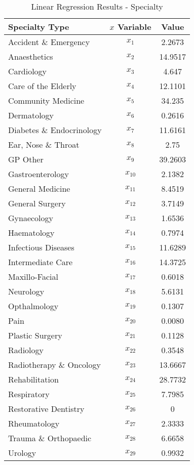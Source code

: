 \documentclass[../thesis.tex]{subfiles}
\begin{document}
\begin{table}[]
    \centering
    \begin{tabular}{lcc} \toprule
      Specialty Type   & $x$ Variable & Value \\ \midrule
      Accident \& Emergency & $x_{1}$ & 2.2673\\ 
      Anaesthetics & $x_{2}$ & 14.9517 \\
      Cardiology & $x_{3}$ & 4.647\\
      Care of the Elderly & $x_{4}$ & 12.1101 \\
      Community Medicine & $x_{5}$ & 34.235\\
      Dermatology & $x_{6}$ & 0.2616\\
      Diabetes \& Endocrinology & $x_{7}$ & 11.6161\\
      Ear, Nose \& Throat & $x_{8}$ &2.75 \\
      GP Other & $x_{9}$ & 39.2603\\
      Gastroenterology & $x_{10}$ &2.1382 \\
      General Medicine & $x_{11}$ & 8.4519\\
      General Surgery & $x_{12}$ & 3.7149\\
      Gynaecology & $x_{13}$ & 1.6536\\
      Haematology & $x_{14}$ & 0.7974\\
      Infectious Diseases & $x_{15}$ &11.6289 \\
      Intermediate Care & $x_{16}$ &14.3725 \\
      Maxillo-Facial & $x_{17}$ & 0.6018\\
      Neurology & $x_{18}$ & 5.6131 \\
      Opthalmology & $x_{19}$ &0.1307 \\
      Pain & $x_{20}$ & 0.0080\\
      Plastic Surgery & $x_{21}$ & 0.1128\\
      Radiology & $x_{22}$ & 0.3548\\
      Radiotherapy \& Oncology & $x_{23}$ & 13.6667\\
      Rehabilitation & $x_{24}$ & 28.7732\\
      Respiratory & $x_{25}$ & 7.7985\\
      Restorative Dentistry & $x_{26}$ & 0\\
      Rheumatology & $x_{27}$ & 2.3333\\
      Trauma \& Orthopaedic & $x_{28}$ & 6.6658\\
      Urology & $x_{29}$ &0.9932 \\\bottomrule
    \end{tabular}
    \caption{Linear Regression Results - Specialty}
    \label{tab:linreg-specialty}
\end{table}
\end{document}
